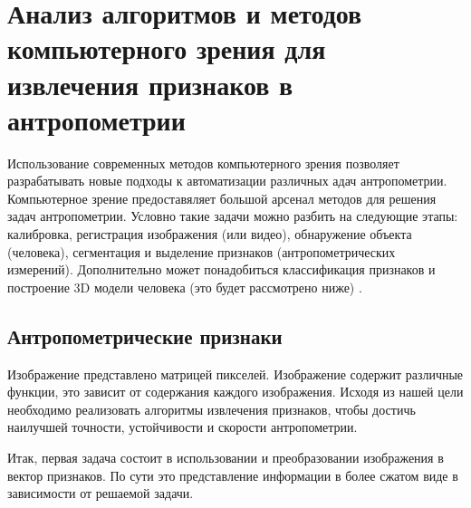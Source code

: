 \section{Анализ алгоритмов и методов компьютерного зрения для извлечения признаков в антропометрии}

Использование современных методов компьютерного зрения позволяет разрабатывать новые подходы к автоматизации различных адач антропометрии. Компьютерное зрение предоставяляет большой арсенал методов для решения задач антропометрии. Условно такие задачи можно разбить на следующие этапы: калибровка, регистрация изображения (или видео), обнаружение объекта (человека), сегментация и выделение признаков (антропометрических измерений). Дополнительно может понадобиться классификация признаков и  построение 3D модели человека (это будет рассмотрено ниже) \cite{Rebak2016}.

\subsection{Антропометрические признаки}

Изображение представлено матрицей пикселей. Изображение содержит различные функции, это зависит от содержания каждого изображения. Исходя из нашей цели необходимо реализовать алгоритмы извлечения признаков, чтобы достичь наилучшей точности, устойчивости и скорости антропометрии.

Итак, первая задача состоит в использовании и преобразовании изображения в вектор признаков. По сути это представление информации в более сжатом виде в зависимости от решаемой задачи. 

